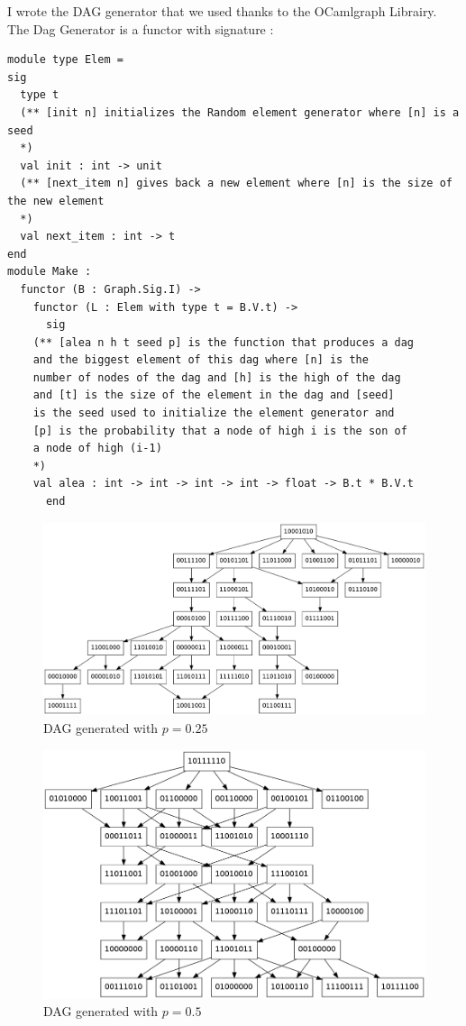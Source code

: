 I wrote the DAG generator that we used thanks to the OCamlgraph Librairy. The Dag Generator is a functor with signature :
\begin{lstlisting}
module type Elem = 
sig
  type t
  (** [init n] initializes the Random element generator where [n] is a seed
  *)
  val init : int -> unit
  (** [next_item n] gives back a new element where [n] is the size of the new element
  *)
  val next_item : int -> t
end
module Make :
  functor (B : Graph.Sig.I) ->
    functor (L : Elem with type t = B.V.t) ->
      sig
	(** [alea n h t seed p] is the function that produces a dag
	and the biggest element of this dag where [n] is the
	number of nodes of the dag and [h] is the high of the dag
	and [t] is the size of the element in the dag and [seed]
	is the seed used to initialize the element generator and
	[p] is the probability that a node of high i is the son of
	a node of high (i-1)
	*)
	val alea : int -> int -> int -> int -> float -> B.t * B.V.t
      end
\end{lstlisting}

\begin{figure}[H]
 \includegraphics[width = \textwidth]{./image/DagGen/output025.png}
 \caption{DAG generated with $p=0.25$} \label{DAGgen}
\end{figure}
\begin{figure}[H]
 \includegraphics[width = \textwidth]{./image/DagGen/output05.png}
 \caption{DAG generated with $p=0.5$}
\end{figure}
